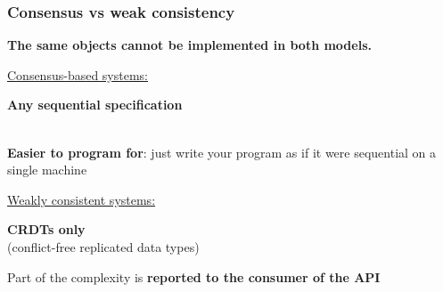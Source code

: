 \documentclass[aspectratio=169]{beamer}
\begin{document}
\begin{frame}
	\frametitle{Consensus vs weak consistency}
	\begin{center}
		\textbf{The same objects cannot be implemented in both models.}
	\end{center}
	\vspace{2em}

	\hspace{1em}
	\begin{minipage}{6.5cm}
		\underline{Consensus-based systems:}

		\vspace{1em}

		\textbf{Any sequential specification}\\~

		\vspace{1em}
		\textbf{Easier to program for}: just write your program as if it were sequential on a single machine

	\end{minipage}
	\hfill
	\begin{minipage}{6.5cm}
		\underline{Weakly consistent systems:}

		\vspace{1em}
		
		\textbf{CRDTs only}\\(conflict-free replicated data types)

		\vspace{1em}
		Part of the complexity is \textbf{reported to the consumer of the API}\\~
	\end{minipage}
	\hspace{1em}
\end{frame}
\end{document}
